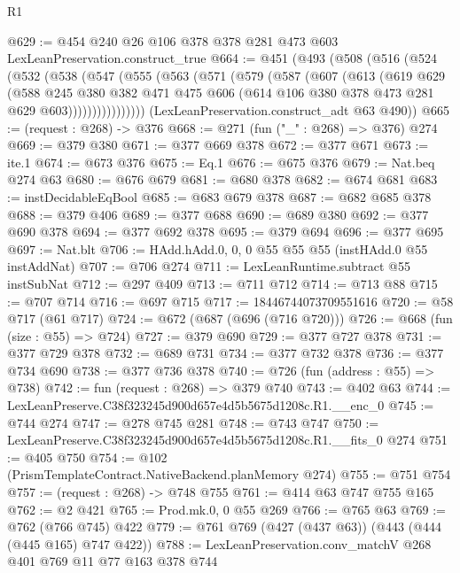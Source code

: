 \begin{lexlean}{R1}
\begin{coremodule}
@629 := @454 @240 @26 @106 @378 @378 @281 @473 @603 LexLeanPreservation.construct_true
@664 := @451
    (@493
      (@508
        (@516
          (@524
            (@532
              (@538
                (@547
                  (@555
                    (@563
                      (@571
                        (@579
                          (@587
                            (@607
                              (@613
                                (@619
                                  @629
                                  (@588
                                    @245
                                    @380
                                    @382
                                    @471
                                    @475
                                    @606
                                    (@614 @106 @380 @378 @473 @281 @629 @603))))))))))))))))
      (LexLeanPreservation.construct_adt @63 @490))
@665 := (request : @268) -> @376
@668 := @271 (fun ("_" : @268) => @376) @274
@669 := @379 @380
@671 := @377 @669 @378
@672 := @377 @671
@673 := ite.{1}
@674 := @673 @376
@675 := Eq.{1}
@676 := @675 @376
@679 := Nat.beq @274 @63
@680 := @676 @679
@681 := @680 @378
@682 := @674 @681
@683 := instDecidableEqBool
@685 := @683 @679 @378
@687 := @682 @685 @378
@688 := @379 @406
@689 := @377 @688
@690 := @689 @380
@692 := @377 @690 @378
@694 := @377 @692 @378
@695 := @379 @694
@696 := @377 @695
@697 := Nat.blt
@706 := HAdd.hAdd.{0, 0, 0} @55 @55 @55 (instHAdd.{0} @55 instAddNat)
@707 := @706 @274
@711 := LexLeanRuntime.subtract @55 instSubNat
@712 := @297 @409
@713 := @711 @712
@714 := @713 @88
@715 := @707 @714
@716 := @697 @715
@717 := 18446744073709551616
@720 := @58 @717 (@61 @717)
@724 := @672 (@687 (@696 (@716 @720)))
@726 := @668 (fun (size : @55) => @724)
@727 := @379 @690
@729 := @377 @727 @378
@731 := @377 @729 @378
@732 := @689 @731
@734 := @377 @732 @378
@736 := @377 @734 @690
@738 := @377 @736 @378
@740 := @726 (fun (address : @55) => @738)
@742 := fun (request : @268) => @379 @740
@743 := @402 @63
@744 := LexLeanPreserve.C38f323245d900d657e4d5b5675d1208c.R1.__enc_0
@745 := @744 @274
@747 := @278 @745 @281
@748 := @743 @747
@750 := LexLeanPreserve.C38f323245d900d657e4d5b5675d1208c.R1.__fits_0 @274
@751 := @405 @750
@754 := @102 (PrismTemplateContract.NativeBackend.planMemory @274)
@755 := @751 @754
@757 := (request : @268) -> @748 @755
@761 := @414 @63 @747 @755 @165
@762 := @2 @421
@765 := Prod.mk.{0, 0} @55 @269
@766 := @765 @63
@769 := @762 (@766 @745) @422
@779 := @761 @769 (@427 (@437 @63)) (@443 (@444 (@445 @165) @747 @422))
@788 := LexLeanPreservation.conv_matchV @268 @401 @769 @11 @77 @163 @378 @744

\end{coremodule}
\end{lexlean}
